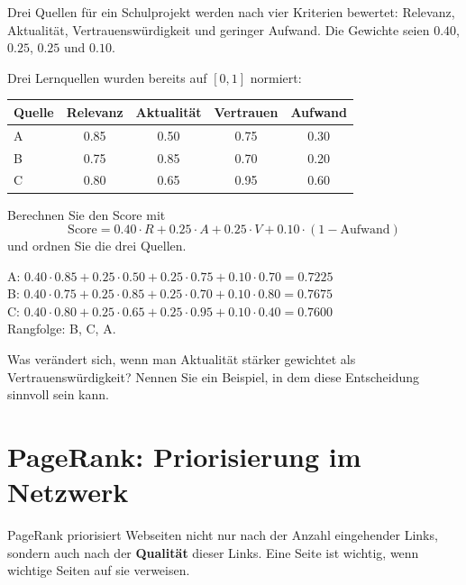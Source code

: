 \begin{myexample}
Drei Quellen für ein Schulprojekt werden nach vier Kriterien bewertet:
Relevanz, Aktualität, Vertrauenswürdigkeit und geringer Aufwand.
Die Gewichte seien $0.40$, $0.25$, $0.25$ und $0.10$.
\end{myexample}

\begin{myexercise}
Drei Lernquellen wurden bereits auf $[0,1]$ normiert:

\begin{center}
\begin{tabular}{lcccc}
\toprule
Quelle & Relevanz & Aktualität & Vertrauen & Aufwand \\
\midrule
A & 0.85 & 0.50 & 0.75 & 0.30 \\
B & 0.75 & 0.85 & 0.70 & 0.20 \\
C & 0.80 & 0.65 & 0.95 & 0.60 \\
\bottomrule
\end{tabular}
\end{center}

Berechnen Sie den Score mit
\[
\text{Score} = 0.40\cdot R + 0.25\cdot A + 0.25\cdot V + 0.10\cdot(1-\text{Aufwand})
\]
und ordnen Sie die drei Quellen.
\begin{myanswer}
A: $0.40\cdot0.85 + 0.25\cdot0.50 + 0.25\cdot0.75 + 0.10\cdot0.70 = 0.7225$ \\
B: $0.40\cdot0.75 + 0.25\cdot0.85 + 0.25\cdot0.70 + 0.10\cdot0.80 = 0.7675$ \\
C: $0.40\cdot0.80 + 0.25\cdot0.65 + 0.25\cdot0.95 + 0.10\cdot0.40 = 0.7600$ \\
Rangfolge: B, C, A.
\end{myanswer}
\end{myexercise}

\begin{myexercise}
Was verändert sich, wenn man Aktualität stärker gewichtet als Vertrauenswürdigkeit?
Nennen Sie ein Beispiel, in dem diese Entscheidung sinnvoll sein kann.
\end{myexercise}

\section{PageRank: Priorisierung im Netzwerk}

\begin{mydefinition}[PageRank]
PageRank priorisiert Webseiten nicht nur nach der Anzahl eingehender Links,
sondern auch nach der \textbf{Qualität} dieser Links.
Eine Seite ist wichtig, wenn wichtige Seiten auf sie verweisen.
\end{mydefinition}

